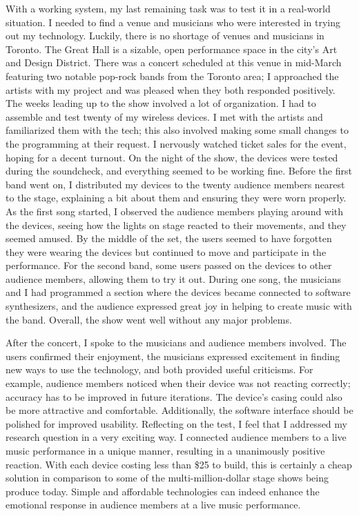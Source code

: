 With a working system, my last remaining task was to test it in a real-world situation. I needed to find a venue and musicians who were interested in trying out my technology. Luckily, there is no shortage of venues and musicians in Toronto. The Great Hall is a sizable, open performance space in the city's Art and Design District. There was a concert scheduled at this venue in mid-March featuring two notable pop-rock bands from the Toronto area; I approached the artists with my project and was pleased when they both responded positively. The weeks leading up to the show involved a lot of organization. I had to assemble and test twenty of my wireless devices. I met with the artists and familiarized them with the tech; this also involved making some small changes to the programming at their request. I nervously watched ticket sales for the event, hoping for a decent turnout. On the night of the show, the devices were tested during the soundcheck, and everything seemed to be working fine. Before the first band went on, I distributed my devices to the twenty audience members nearest to the stage, explaining a bit about them and ensuring they were worn properly. As the first song started, I observed the audience members playing around with the devices, seeing how the lights on stage reacted to their movements, and they seemed amused. By the middle of the set, the users seemed to have forgotten they were wearing the devices but continued to move and participate in the performance. For the second band, some users passed on the devices to other audience members, allowing them to try it out. During one song, the musicians and I had programmed a section where the devices became connected to software synthesizers, and the audience expressed great joy in helping to create music with the band. Overall, the show went well without any major problems.

After the concert, I spoke to the musicians and audience members involved. The users confirmed their enjoyment, the musicians expressed excitement in finding new ways to use the technology, and both provided useful criticisms. For example, audience members noticed when their device was not reacting correctly; accuracy has to be improved in future iterations. The device's casing could also be more attractive and comfortable. Additionally, the software interface should be polished for improved usability. Reflecting on the test, I feel that I addressed my research question in a very exciting way. I connected audience members to a live music performance in a unique manner, resulting in a unanimously positive reaction. With each device costing less than \$25 to build, this is certainly a cheap solution in comparison to some of the multi-million-dollar stage shows being produce today. Simple and affordable technologies can indeed enhance the emotional response in audience members at a live music performance.